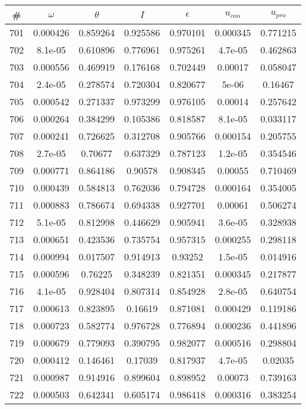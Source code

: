 \newpage
\begin{table}
\begin{tabular}{c|c|c|c|c|c|c}
\# & $\omega$ & $\theta$ & $I$ & $\epsilon$ & $u_{con}$ & $u_{pro}$\\
\hline
701 & 0.000426 & 0.859264 & 0.925586 & 0.970101 & 0.000345 & 0.771215\\
702 & 8.1e-05 & 0.610896 & 0.776961 & 0.975261 & 4.7e-05 & 0.462863\\
703 & 0.000556 & 0.469919 & 0.176168 & 0.702449 & 0.00017 & 0.058047\\
704 & 2.4e-05 & 0.278574 & 0.720304 & 0.820677 & 5e-06 & 0.16467\\
705 & 0.000542 & 0.271337 & 0.973299 & 0.976105 & 0.00014 & 0.257642\\
706 & 0.000264 & 0.384299 & 0.105386 & 0.818587 & 8.1e-05 & 0.033117\\
707 & 0.000241 & 0.726625 & 0.312708 & 0.905766 & 0.000154 & 0.205755\\
708 & 2.7e-05 & 0.70677 & 0.637329 & 0.787123 & 1.2e-05 & 0.354546\\
709 & 0.000771 & 0.864186 & 0.90578 & 0.908345 & 0.00055 & 0.710469\\
710 & 0.000439 & 0.584813 & 0.762036 & 0.794728 & 0.000164 & 0.354005\\
711 & 0.000883 & 0.786674 & 0.694338 & 0.927701 & 0.00061 & 0.506274\\
712 & 5.1e-05 & 0.812998 & 0.446629 & 0.905941 & 3.6e-05 & 0.328938\\
713 & 0.000651 & 0.423536 & 0.735754 & 0.957315 & 0.000255 & 0.298118\\
714 & 0.000994 & 0.017507 & 0.914913 & 0.93252 & 1.5e-05 & 0.014916\\
715 & 0.000596 & 0.76225 & 0.348239 & 0.821351 & 0.000345 & 0.217877\\
716 & 4.1e-05 & 0.928404 & 0.807314 & 0.854928 & 2.8e-05 & 0.640754\\
717 & 0.000613 & 0.823895 & 0.16619 & 0.871081 & 0.000429 & 0.119186\\
718 & 0.000723 & 0.582774 & 0.976728 & 0.776894 & 0.000236 & 0.441896\\
719 & 0.000679 & 0.779093 & 0.390795 & 0.982077 & 0.000516 & 0.298804\\
720 & 0.000412 & 0.146461 & 0.17039 & 0.817937 & 4.7e-05 & 0.02035\\
721 & 0.000987 & 0.914916 & 0.899604 & 0.898952 & 0.00073 & 0.739163\\
722 & 0.000503 & 0.642341 & 0.605174 & 0.986418 & 0.000316 & 0.383254\\

\end{tabular}
\end{table}
